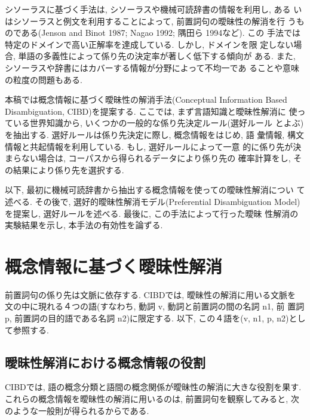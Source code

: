 シソーラスに基づく手法は, シソーラスや機械可読辞書の情報を利用し, ある
いはシソーラスと例文を利用することによって, 前置詞句の曖昧性の解消を行
うものである(Jenson and Binot 1987; Nagao 1992; 隅田ら 1994など). この
手法では特定のドメインで高い正解率を達成している. しかし, ドメインを限
定しない場合, 単語の多義性によって係り先の決定率が著しく低下する傾向が
ある. また, シソーラスや辞書にはカバーする情報が分野によって不均一であ
ることや意味の粒度の問題もある. 

本稿では概念情報に基づく曖昧性の解消手法(Conceptual Information Based
Disambiguation, CIBD)を提案する. ここでは, まず言語知識と曖昧性解消に
使っている世界知識から, いくつかの一般的な係り先決定ルール(選好ルール
とよぶ)を抽出する. 選好ルールは係り先決定に際し, 概念情報をはじめ, 語
彙情報, 構文情報と共起情報を利用している. もし, 選好ルールによって一意
的に係り先が決まらない場合は, コーパスから得られるデータにより係り先の
確率計算をし, その結果により係り先を選択する. 

以下, 最初に機械可読辞書から抽出する概念情報を使っての曖昧性解消につい
て述べる. その後で, 選好的曖昧性解消モデル(Preferential Disambiguation
Model)を提案し, 選好ルールを述べる. 最後に, この手法によって行った曖昧
性解消の実験結果を示し, 本手法の有効性を論ずる. 

\section{概念情報に基づく曖昧性解消}

前置詞句の係り先は文脈に依存する. CIBDでは, 曖昧性の解消に用いる文脈を
文の中に現れる４つの語(すなわち, 動詞 v, 動詞と前置詞の間の名詞 n1, 前
置詞 p, 前置詞の目的語である名詞 n2)に限定する. 以下, この４語を(v,
n1, p, n2)として参照する. 

\subsection{曖昧性解消における概念情報の役割}

CIBDでは, 語の概念分類と語間の概念関係が曖昧性の解消に大きな役割を果す.
これらの概念情報を曖昧性の解消に用いるのは, 前置詞句を観察してみると, 
次のような一般則が得られるからである. 

